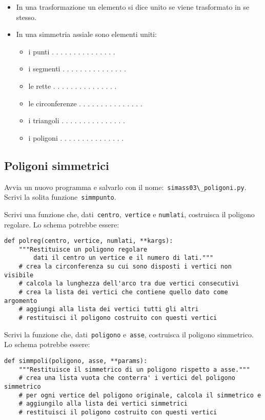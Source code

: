 \begin{itemize} [noitemsep]
\item In una trasformazione un elemento si dice unito se viene trasformato in se
stesso.
\item In una simmetria assiale sono elementi uniti:
\begin{itemize} [noitemsep]
\item i punti . . . . . . . . . . . . . . .
\item i segmenti . . . . . . . . . . . . . . .
\item le rette . . . . . . . . . . . . . . .
\item le circonferenze . . . . . . . . . . . . . . .
\item i triangoli . . . . . . . . . . . . . . .
\item i poligoni . . . . . . . . . . . . . . .
\end{itemize}
\end{itemize}


\subsection{Poligoni simmetrici}

Avvia un nuovo programma e salvarlo con il 
nome:~\lstinline{simass03\_poligoni.py}.
Scrivi la solita funzione~\lstinline{simmpunto}.

Scrivi una funzione che, dati~\lstinline{centro},~\lstinline{vertice} e 
\texttt{numlati},
costruisca il poligono regolare. Lo schema potrebbe essere:

\begin{lstlisting}
def polreg(centro, vertice, numlati, **kargs):
    """Restituisce un poligono regolare 
        dati il centro un vertice e il numero di lati."""
    # crea la circonferenza su cui sono disposti i vertici non visibile
    # calcola la lunghezza dell'arco tra due vertici consecutivi
    # crea la lista dei vertici che contiene quello dato come argomento
    # aggiungi alla lista dei vertici tutti gli altri
    # restituisci il poligono costruito con questi vertici
\end{lstlisting}

Scrivi la funzione che, dati~\lstinline{poligono} e~\lstinline{asse},
costruisca il poligono simmetrico. Lo schema potrebbe essere:

\begin{lstlisting}
def simmpoli(poligono, asse, **params):
    """Restituisce il simmetrico di un poligono rispetto a asse."""
    # crea una lista vuota che conterra' i vertici del poligono simmetrico
    # per ogni vertice del poligono originale, calcola il simmetrico e
    # aggiungilo alla lista dei vertici simmetrici
    # restituisci il poligono costruito con questi vertici
\end{lstlisting}

